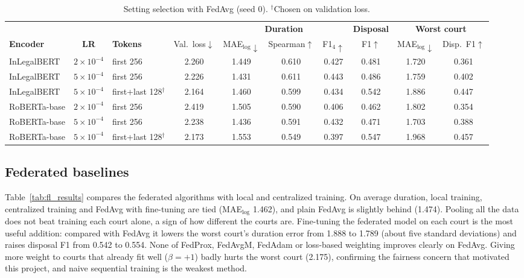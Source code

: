 \begin{table}[H]
\centering
\footnotesize
\setlength{\tabcolsep}{4pt}
\begin{tabular}{l c l c ccc c cc}
\toprule
& & & & \multicolumn{3}{c}{\textbf{Duration}} & \textbf{Disposal} & \multicolumn{2}{c}{\textbf{Worst court}} \\
\cmidrule(lr){5-7}\cmidrule(lr){8-8}\cmidrule(lr){9-10}
\textbf{Encoder} & \textbf{LR} & \textbf{Tokens} & Val.\ loss$\downarrow$ & MAE$_{\log}\downarrow$ & Spearman$\uparrow$ & F1$_4\uparrow$ & F1$\uparrow$ & MAE$_{\log}\downarrow$ & Disp.\ F1$\uparrow$ \\
\midrule
InLegalBERT & $2{\times}10^{-4}$ & first 256 & 2.260 & 1.449 & 0.610 & 0.427 & 0.481 & 1.720 & 0.361 \\
InLegalBERT & $5{\times}10^{-4}$ & first 256 & 2.226 & 1.431 & 0.611 & 0.443 & 0.486 & 1.759 & 0.402 \\
InLegalBERT & $5{\times}10^{-4}$ & first+last 128$^\dagger$ & 2.164 & 1.460 & 0.599 & 0.434 & 0.542 & 1.886 & 0.447 \\
\midrule
RoBERTa-base & $2{\times}10^{-4}$ & first 256 & 2.419 & 1.505 & 0.590 & 0.406 & 0.462 & 1.802 & 0.354 \\
RoBERTa-base & $5{\times}10^{-4}$ & first 256 & 2.238 & 1.436 & 0.591 & 0.432 & 0.471 & 1.703 & 0.388 \\
RoBERTa-base & $5{\times}10^{-4}$ & first+last 128$^\dagger$ & 2.173 & 1.553 & 0.549 & 0.397 & 0.547 & 1.968 & 0.457 \\
\bottomrule
\end{tabular}
\caption{Setting selection with FedAvg (seed 0). $^\dagger$Chosen on validation loss.}
\label{tab:fl_ablation}
\end{table}

\subsection{Federated baselines}
Table~\ref{tab:fl_results} compares the federated algorithms with local and centralized training. On average duration, local training, centralized training and FedAvg with fine-tuning are tied (MAE$_{\log}$ 1.462), and plain FedAvg is slightly behind (1.474). Pooling all the data does not beat training each court alone, a sign of how different the courts are. Fine-tuning the federated model on each court is the most useful addition: compared with FedAvg it lowers the worst court's duration error from 1.888 to 1.789 (about five standard deviations) and raises disposal F1 from 0.542 to 0.554. None of FedProx, FedAvgM, FedAdam or loss-based weighting improves clearly on FedAvg. Giving more weight to courts that already fit well ($\beta=+1$) badly hurts the worst court (2.175), confirming the fairness concern that motivated this project, and naive sequential training is the weakest method.

